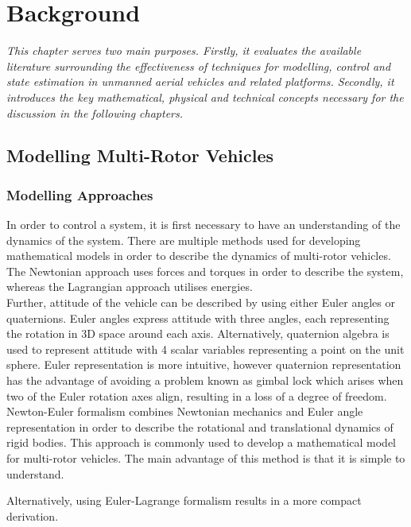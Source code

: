 
\chapter{Background}
\textit{This chapter serves two main purposes. Firstly, it evaluates the available literature surrounding the effectiveness of techniques for modelling, control and state estimation in unmanned aerial vehicles and related platforms. Secondly, it introduces the key mathematical, physical and technical concepts necessary for the discussion in the following chapters.}

\section{Modelling Multi-Rotor Vehicles}
\subsection{Modelling Approaches}
In order to control a system, it is first necessary to have an understanding of the dynamics of the system. There are multiple methods used for developing mathematical models in order to describe the dynamics of multi-rotor vehicles. The Newtonian approach uses forces and torques in order to describe the system, whereas the Lagrangian approach utilises energies\cite{Raine2017}.\\

 Further, attitude of the vehicle can be described by using either Euler angles or quaternions. Euler angles express attitude with three angles, each representing the rotation in 3D space around each axis. Alternatively, quaternion algebra is used to represent attitude with 4 scalar variables representing a point on the unit sphere\cite{Voight2021}. Euler representation is more intuitive, however quaternion representation has the advantage of avoiding a problem known as gimbal lock which arises when two of the Euler rotation axes align, resulting in a loss of a degree of freedom.\\

Newton-Euler formalism combines Newtonian mechanics and Euler angle representation in order to describe the rotational and translational dynamics of rigid bodies. This approach is commonly used to develop a mathematical model for multi-rotor vehicles. The main advantage of this method is that it is simple to understand. 


Alternatively, using Euler-Lagrange formalism results in a more compact derivation\cite{Zhang2014}. \\

